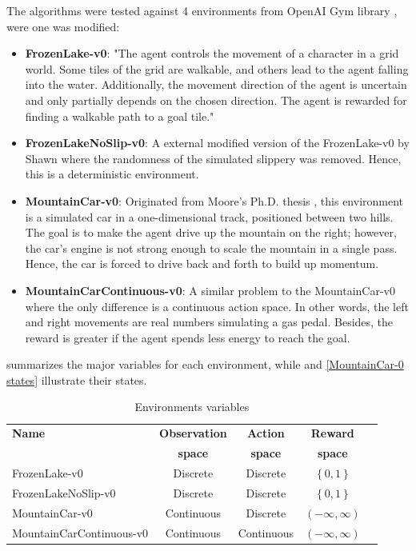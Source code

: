 \documentclass[conference]{IEEEtran}
\begin{document}
The algorithms were tested against 4 environments from OpenAI Gym library \cite{OpenAIGym}, were one was modified:
\begin{itemize}
    \item \textbf{FrozenLake-v0}: "The agent controls the movement of a character in a grid world. Some tiles of the grid are walkable, and others lead to the agent falling into the water. Additionally, the movement direction of the agent is uncertain and only partially depends on the chosen direction. The agent is rewarded for finding a walkable path to a goal tile." \cite{OpenAIGym}
    \item \textbf{FrozenLakeNoSlip-v0}: A external modified version of the FrozenLake-v0 by Shawn where the randomness of the simulated slippery was removed. Hence, this is a deterministic environment. \cite{TheComputerScientist:2018}
    \item \textbf{MountainCar-v0}: Originated from Moore's Ph.D. thesis \cite{Moore:1990}, this environment is a simulated car in a one-dimensional track, positioned between two hills. The goal is to make the agent drive up the mountain on the right; however, the car's engine is not strong enough to scale the mountain in a single pass. Hence, the car is forced to drive back and forth to build up momentum.
    \item \textbf{MountainCarContinuous-v0}: A similar problem to the MountainCar-v0 where the only difference is a continuous action space. In other words, the left and right movements are real numbers simulating a gas pedal. Besides, the reward is greater if the agent spends less energy to reach the goal.
\end{itemize}
 summarizes the major variables for each environment, while  and \ref{MountainCar-0 states} illustrate their states.

\begin{table}[t]
    \caption{Environments variables}
    \begin{center}
    \begin{tabular}{|l|c|c|c|c}
        \hline \textbf{Name}           & \textbf{Observation}& \textbf{Action}& \textbf{Reward}                \\
                                       & \textbf{space}      & \textbf{space} & \textbf{space}                 \\
        \hline FrozenLake-v0           & Discrete            & Discrete       & $\left\{0, 1\right\}$          \\
        \hline FrozenLakeNoSlip-v0     & Discrete            & Discrete       & $\left\{0, 1\right\}$          \\
        \hline MountainCar-v0          & Continuous          & Discrete       & $\left(-\infty, \infty\right)$ \\
        \hline MountainCarContinuous-v0& Continuous          & Continuous     & $\left(-\infty, \infty\right)$ \\
        \hline
    \end{tabular}
    \label{environment variables}
    \end{center}
\end{table}
\end{document}
